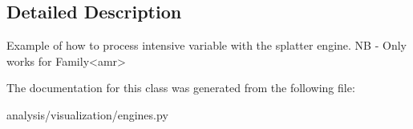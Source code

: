 \subsection{Detailed Description}
\begin{DoxyVerb}
Example of how to process intensive variable with the splatter engine.
NB - Only works for Family<amr>
\end{DoxyVerb}
 

The documentation for this class was generated from the following file:\begin{DoxyCompactItemize}
\item 
analysis/visualization/engines.py\end{DoxyCompactItemize}
